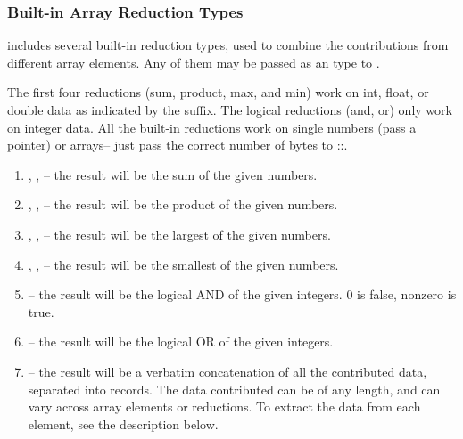 \subsubsection{Built-in Array Reduction Types}

\charmpp{} includes several built-in reduction types, used to combine the
contributions from different array elements.  Any of them may be passed as an
 type to .

The first four reductions (sum, product, max, and min) work on int,
float, or double data as indicated by the suffix.  The logical
reductions (and, or) only work on integer data.  All the built-in
reductions work on single numbers (pass a pointer) or arrays-- just
pass the correct number of bytes to
::.

\begin{enumerate}

\item {}, , -- the
result will be the sum of the given numbers.

\item {}, ,
-- the result will be the product of the given numbers.

\item {}, , -- the
result will be the largest of the given numbers.

\item {}, , -- the
result will be the smallest of the given numbers.

\item {}-- the result will be the logical AND of the given
integers.  0 is false, nonzero is true.

\item {}-- the result will be the logical OR of the given
integers.

\item {}-- the result will be a verbatim concatenation of
all the contributed data, separated into  records.
The data contributed can be of any length, and can vary across array elements
or reductions.  To extract the data from each element, see the description
below.

\end{enumerate}


